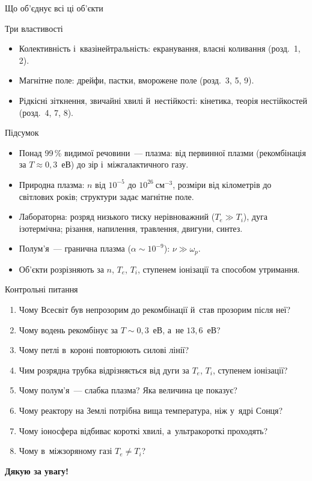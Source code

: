 \documentclass[]{beamer}
\begin{document}
\begin{frame}{Що об'єднує всі ці об'єкти}
	\begin{block}{Три властивості}\justifying\small
		\begin{itemize}
			\item \alert{Колективність і~квазінейтральність}: екранування, власні коливання (розд.~1, 2).
			\item \alert{Магнітне поле}: дрейфи, пастки, вморожене поле (розд.~3, 5, 9).
			\item \alert{Рідкісні зіткнення, звичайні хвилі й~нестійкості}: кінетика, теорія нестійкостей (розд.~4, 7, 8).
		\end{itemize}
	\end{block}
\end{frame}

\begin{frame}{Підсумок}
	\begin{block}{}\justifying\footnotesize
		\begin{itemize}
			\item Понад 99\,\% видимої речовини~--- плазма: від первинної плазми (рекомбінація за $T\approx0{,}3$~еВ) до зір і~міжгалактичного газу.
			\item Природна плазма: $n$ від $10^{-5}$ до $10^{26}~\mathrm{см}^{-3}$, розміри від кілометрів до світлових років; структури задає магнітне поле.
			\item Лабораторна: розряд низького тиску нерівноважний ($T_e\gg T_i$), дуга ізотермічна; різання, напилення, травлення, двигуни, синтез.
			\item Полум'я~--- гранична плазма ($\alpha\sim10^{-9}$): $\nu\gg\omega_p$.
			\item Об'єкти розрізняють за $n$, $T_e$, $T_i$, ступенем іонізації та способом утримання.
		\end{itemize}
	\end{block}
\end{frame}

\begin{frame}{Контрольні питання}
	\begin{enumerate}\justifying\small
		\item Чому Всесвіт був непрозорим до рекомбінації й~став прозорим після неї?
		\item Чому водень рекомбінує за $T\sim0{,}3$~еВ, а~не $13{,}6$~еВ?
		\item Чому петлі в~короні повторюють силові лінії?
		\item Чим розрядна трубка відрізняється від дуги за $T_e$, $T_i$, ступенем іонізації?
		\item Чому полум'я~--- слабка плазма? Яка величина це показує?
		\item Чому реактору на Землі потрібна вища температура, ніж у~ядрі Сонця?
		\item Чому іоносфера відбиває короткі хвилі, а~ультракороткі проходять?
		\item Чому в~міжзоряному газі $T_e\ne T_i$?
	\end{enumerate}
\end{frame}

\begin{frame}
	\centering
	\vspace{1.5cm}
	{\bfseries\huge Дякую за увагу!}
\end{frame}
\end{document}
